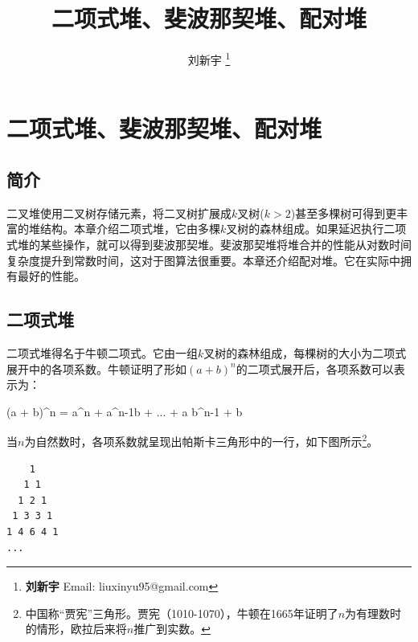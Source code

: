 \documentclass[b5paper]{ctexart}
\begin{document}
\title{二项式堆、斐波那契堆、配对堆}

\author{刘新宇
\thanks{{\bfseries 刘新宇 } \newline
  Email: liuxinyu95@gmail.com \newline}
  }

\maketitle
\fi


\ifx\wholebook\relax
\chapter{二项式堆、斐波那契堆、配对堆}
\fi

\section{简介}
\label{introduction}

二叉堆使用二叉树存储元素，将二叉树扩展成$k$叉树\cite{K-ary-tree}($k>2$)甚至多棵树可得到更丰富的堆结构。本章介绍二项式堆，它由多棵$k$叉树的森林组成。如果延迟执行二项式堆的某些操作，就可以得到斐波那契堆。斐波那契堆将堆合并的性能从对数时间复杂度提升到常数时间，这对于图算法很重要。本章还介绍配对堆。它在实际中拥有最好的性能。

\section{二项式堆}
\label{sec:binomial-heap} 

二项式堆得名于牛顿二项式。它由一组$k$叉树的森林组成，每棵树的大小为二项式展开中的各项系数。牛顿证明了形如$(a + b)^n$的二项式展开后，各项系数可以表示为：

\be
(a + b)^n = a^n +  a^{n-1}b + ... +  a b^{n-1} + b
\ee

当$n$为自然数时，各项系数就呈现出帕斯卡三角形中的一行，如下图所示\footnote{中国称“贾宪”三角形。贾宪（1010-1070），牛顿在1665年证明了$n$为有理数时的情形，欧拉后来将$n$推广到实数。}\cite{wiki-pascal-triangle}。

\begin{center}
\begin{BVerbatim}
    1
   1 1
  1 2 1
 1 3 3 1
1 4 6 4 1
...
\end{BVerbatim}
\end{center}
\end{document}
